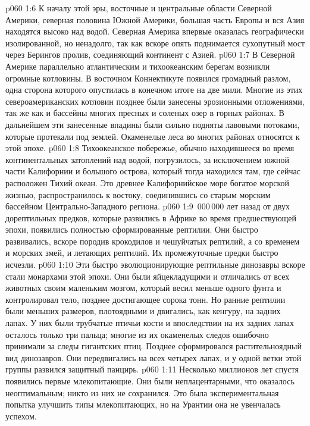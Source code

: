 \vs p060 1:6 К началу этой эры, восточные и центральные области Северной Америки, северная половина Южной Америки, большая часть Европы и вся Азия находятся высоко над водой. Северная Америка впервые оказалась географически изолированной, но ненадолго, так как вскоре опять поднимается сухопутный мост через Берингов пролив, соединяющий континент с Азией.
\vs p060 1:7 В Северной Америке параллельно атлантическим и тихоокеанским берегам возникли огромные котловины. В восточном Коннектикуте появился громадный разлом, одна сторона которого опустилась в конечном итоге на две мили. Многие из этих североамериканских котловин позднее были занесены эрозионными отложениями, так же как и бассейны многих пресных и соленых озер в горных районах. В дальнейшем эти занесенные впадины были сильно подняты лавовыми потоками, которые протекали под землей. Окаменелые леса во многих районах относятся к этой эпохе.
\vs p060 1:8 Тихоокеанское побережье, обычно находившееся во время континентальных затоплений над водой, погрузилось, за исключением южной части Калифорнии и большого острова, который тогда находился там, где сейчас расположен Тихий океан. Это древнее Калифорнийское море богатое морской жизнью, распространилось к востоку, соединившись со старым морским бассейном Центрально\hyp{}Западного региона.
\vs p060 1:9 \,000\,000 лет назад от двух дорептильных предков, которые развились в Африке во время предшествующей эпохи,  появились полностью сформированные рептилии. Они быстро развивались, вскоре породив крокодилов и чешуйчатых рептилий, а со временем и морских змей, и летающих рептилий. Их промежуточные предки быстро исчезли.
\vs p060 1:10 Эти быстро эволюционирующие рептильные динозавры вскоре стали монархами этой эпохи. Они были яйцекладущими и отличались от всех животных своим маленьким мозгом, который весил меньше одного фунта и контролировал тело, позднее достигающее сорока тонн. Но ранние рептилии были меньших размеров, плотоядными и двигались, как кенгуру, на задних лапах. У них были трубчатые птичьи кости и впоследствии на их задних лапах осталось только три пальца; многие из их окаменелых следов ошибочно принимали за следы гигантских птиц. Позднее сформировался растительноядный вид динозавров. Они передвигались на всех четырех лапах, и у одной ветки этой группы развился защитный панцирь.
\vs p060 1:11 Несколько миллионов лет спустя появились первые млекопитающие. Они были неплацентарными, что оказалось неоптимальным; никто из них не сохранился. Это была экспериментальная попытка улучшить типы млекопитающих, но на Урантии она не увенчалась успехом.
